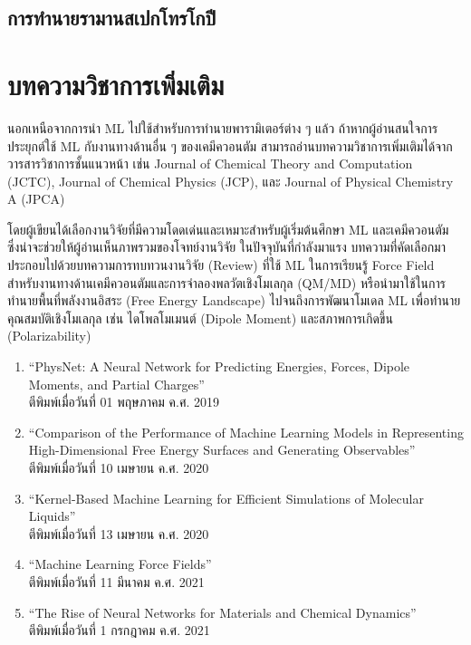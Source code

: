 \subsection{การทำนายรามานสเปกโทรโกปี}

\section{บทความวิชาการเพิ่มเติม}

นอกเหนือจากการนำ ML ไปใช้สำหรับการทำนายพารามิเตอร์ต่าง ๆ แล้ว ถ้าหากผู้อ่านสนใจการประยุกต์ใช้ ML กับงานทางด้านอื่น ๆ ของเคมีควอนตัม 
สามารถอ่านบทความวิชาการเพิ่มเติมได้จากวารสารวิชาการชั้นแนวหน้า เช่น Journal of Chemical Theory and Computation (JCTC), 
Journal of Chemical Physics (JCP), และ Journal of Physical Chemistry A (JPCA)

โดยผู้เขียนได้เลือกงานวิจัยที่มีความโดดเด่นและเหมาะสำหรับผู้เริ่มต้นศึกษา ML และเคมีควอนตัม ซึ่งน่าจะช่วยให้ผู้อ่านเห็นภาพรวมของโจทย์งานวิจัย%
ในปัจจุบันที่กำลังมาแรง บทความที่คัดเลือกมาประกอบไปด้วยบทความการทบทวนงานวิจัย (Review) ที่ใช้ ML ในการเรียนรู้ Force Field 
สำหรับงานทางด้านเคมีควอนตัมและการจําลองพลวัตเชิงโมเลกุล (QM/MD) หรือนำมาใช้ในการทำนายพื้นที่พลังงานอิสระ (Free Energy Landscape)
ไปจนถึงการพัฒนาโมเดล ML เพื่อทำนายคุณสมบัติเชิงโมเลกุล เช่น ไดโพลโมเมนต์ (Dipole Moment) และสภาพการเกิดขึ้น (Polarizability)

\begin{enumerate}
    \item \enquote{PhysNet: A Neural Network for Predicting Energies, Forces, Dipole Moments, and 
    Partial Charges}\autocite{unke2019}\\
    ตีพิมพ์เมื่อวันที่ 01 พฤษภาคม ค.ศ. 2019
    
    \item \enquote{Comparison of the Performance of Machine Learning Models in Representing High-Dimensional 
    Free Energy Surfaces and Generating Observables}\autocite{cendagorta2020}\\
    ตีพิมพ์เมื่อวันที่ 10 เมษายน ค.ศ. 2020
    
    \item \enquote{Kernel-Based Machine Learning for Efficient Simulations of Molecular Liquids}\autocite{scherer2020}\\
    ตีพิมพ์เมื่อวันที่ 13 เมษายน ค.ศ. 2020

    \item \enquote{Machine Learning Force Fields}\autocite{unke2021}\\
    ตีพิมพ์เมื่อวันที่ 11 มีนาคม ค.ศ. 2021\\

    \item \enquote{The Rise of Neural Networks for Materials and Chemical Dynamics}\autocite{kulichenko2021}\\
    ตีพิมพ์เมื่อวันที่ 1 กรกฎาคม ค.ศ. 2021\\

\end{enumerate}
